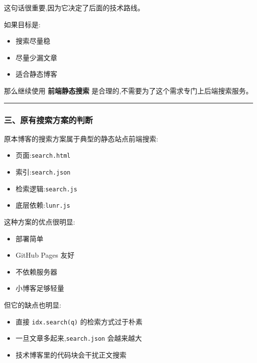 \documentclass[lang=cn,scheme=chinese,color=blue,device=normal,toc=onecol,math=cm]{elegantbook}
\begin{document}
这句话很重要,因为它决定了后面的技术路线。\par


如果目标是:\par


\begin{itemize}
\item 搜索尽量稳
\item 尽量少漏文章
\item 适合静态博客
\end{itemize}


那么继续使用 \textbf{前端静态搜索} 是合理的,不需要为了这个需求专门上后端搜索服务。\par


\medskip\hrule\medskip


\subsubsection{三、原有搜索方案的判断}


原本博客的搜索方案属于典型的静态站点前端搜索:\par


\begin{itemize}
\item 页面:\texttt{search.html}
\item 索引:\texttt{search.json}
\item 检索逻辑:\texttt{search.js}
\item 底层依赖:\texttt{lunr.js}
\end{itemize}


这种方案的优点很明显:\par


\begin{itemize}
\item 部署简单
\item GitHub Pages 友好
\item 不依赖服务器
\item 小博客足够轻量
\end{itemize}


但它的缺点也明显:\par


\begin{itemize}
\item 直接 \texttt{idx.search(q)} 的检索方式过于朴素
\item 一旦文章多起来,\texttt{search.json} 会越来越大
\item 技术博客里的代码块会干扰正文搜索
\end{itemize}
\end{document}
